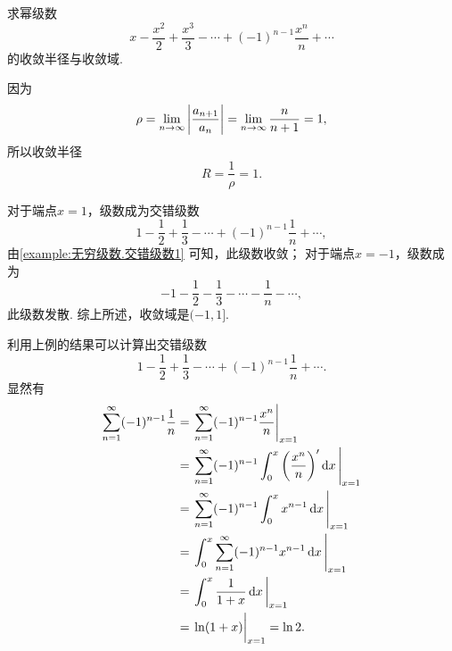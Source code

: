 \begin{example}
求幂级数\begin{equation*}
	x-\frac{x^2}{2}+\frac{x^3}{3}-\dotsb+(-1)^{n-1}\frac{x^n}{n}+\dotsb
\end{equation*}的收敛半径与收敛域.
\begin{solution}
因为\begin{equation*}
	\rho = \lim_{n\to\infty} \abs{\frac{a_{n+1}}{a_n}}
	= \lim_{n\to\infty} \frac{n}{n+1} = 1,
\end{equation*}
所以收敛半径\begin{equation*}
	R = \frac1\rho = 1.
\end{equation*}

对于端点\(x=1\)，级数成为交错级数\begin{equation*}
	1-\frac{1}{2}+\frac{1}{3}-\dotsb+(-1)^{n-1}\frac{1}{n}+\dotsb,
\end{equation*}
由\cref{example:无穷级数.交错级数1} 可知，此级数收敛；
对于端点\(x=-1\)，级数成为\begin{equation*}
	-1-\frac{1}{2}-\frac{1}{3}-\dotsb-\frac{1}{n}-\dotsb,
\end{equation*}
此级数发散.
综上所述，收敛域是\((-1,1]\).
\end{solution}
\end{example}
利用上例的结果可以计算出交错级数\begin{equation*}
	1-\frac{1}{2}+\frac{1}{3}-\dotsb+(-1)^{n-1}\frac{1}{n}+\dotsb.
\end{equation*}
显然有\begin{align*}
	\sum_{n=1}^\infty (-1)^{n-1} \frac{1}{n}
	&= \eval{\sum_{n=1}^\infty (-1)^{n-1} \frac{x^n}{n}}_{x=1} \\
	&= \eval{\sum_{n=1}^\infty (-1)^{n-1} \int_0^x \left(\frac{x^n}{n}\right)' \dd{x}}_{x=1} \\
	&= \eval{\sum_{n=1}^\infty (-1)^{n-1} \int_0^x x^{n-1} \dd{x}}_{x=1} \\
	&= \eval{\int_0^x \sum_{n=1}^\infty (-1)^{n-1} x^{n-1} \dd{x}}_{x=1} \\
	&= \eval{\int_0^x \frac{1}{1+x} \dd{x}}_{x=1} \\
	&= \eval{\ln(1+x)}_{x=1} = \ln2.
\end{align*}
